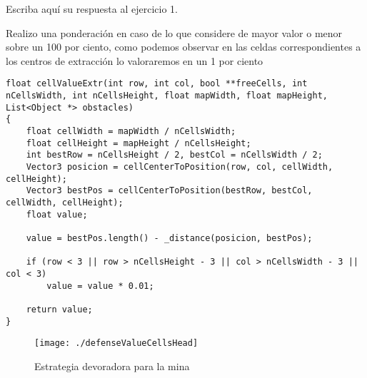 Escriba aquí su respuesta al ejercicio 1. 

Realizo una ponderación en caso de lo que considere de mayor valor o menor sobre un 100 por ciento, como
podemos observar en las celdas correspondientes a los centros de extracción lo valoraremos en un 1 por ciento

\begin{lstlisting}
float cellValueExtr(int row, int col, bool **freeCells, int nCellsWidth, int nCellsHeight, float mapWidth, float mapHeight, List<Object *> obstacles)
{
    float cellWidth = mapWidth / nCellsWidth;
    float cellHeight = mapHeight / nCellsHeight;
    int bestRow = nCellsHeight / 2, bestCol = nCellsWidth / 2;
    Vector3 posicion = cellCenterToPosition(row, col, cellWidth, cellHeight);
    Vector3 bestPos = cellCenterToPosition(bestRow, bestCol, cellWidth, cellHeight);
    float value;

    value = bestPos.length() - _distance(posicion, bestPos);

    if (row < 3 || row > nCellsHeight - 3 || col > nCellsWidth - 3 || col < 3)
        value = value * 0.01;

    return value;
}
\end{lstlisting}

\begin{figure}
\centering
\texttt{[image: ./defenseValueCellsHead]} %
\caption{Estrategia devoradora para la mina}
\label{fig:defenseValueCellsHead}
\end{figure}